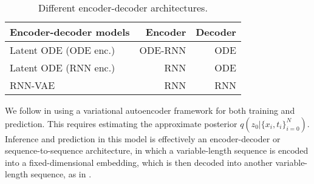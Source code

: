 \documentclass{article}
\begin{document}
\begin{wraptable}[7]{r}{0.49\textwidth}
\centering
\small
\vspace{-0.5cm}
\begin{tabular}{@{}lrr@{}}\toprule
    \textbf{\small Encoder-decoder models} & Encoder & Decoder \\ \midrule
    Latent ODE (ODE enc.) & ODE-RNN & ODE  \\
    Latent ODE (RNN enc.) & RNN & ODE \\
    RNN-VAE & RNN & RNN\\
    \bottomrule
\end{tabular}
\vspace{0.4mm}
\caption{Different encoder-decoder architectures.}
\label{tab:model_comparison}
\end{wraptable}


We follow \citet{NeuralODE} in using a variational autoencoder framework for both training and prediction.
This requires estimating the approximate posterior $q(z_0| \{x_i,t_i\}_{i=0}^N)$.
Inference and prediction in this model is effectively an encoder-decoder or sequence-to-sequence architecture, in which a variable-length sequence is encoded into a fixed-dimensional embedding, which is then decoded into another variable-length sequence, as in \citet{sutskever2014sequence}. 

\begin{table}[b]
\centering
\vspace{-4mm}
\begin{minipage}[c]{0.48\linewidth}
    \caption{Definition of hidden state $h(t)$ between observation times $t_{i-1}$ and $t_i$ in autoregressive models.
    In standard~RNNs, the hidden state does not change between updates.
    In ODE-RNNs, the hidden state is defined by an ODE, and is additionally updated by another network at each observation. } \label{tab:state_dynamics}
 \end{minipage}\hfill \begin{minipage}[c]{0.48\linewidth}
 \end{minipage}
\end{table}
\end{document}
